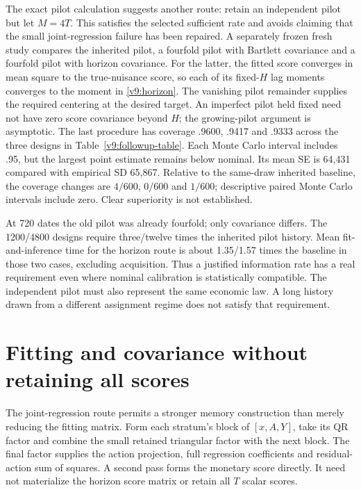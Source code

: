 The exact pilot calculation suggests another route: retain an independent
pilot but let $M=4T$. This satisfies the selected sufficient rate and avoids
claiming that the small joint-regression failure has been repaired.
A separately frozen fresh study compares the inherited pilot, a fourfold
pilot with Bartlett covariance and a fourfold pilot with horizon covariance.
For the latter, the fitted score converges in mean square to the true-nuisance
score, so each of its fixed-$H$ lag moments converges to the moment in
\eqref{v9:horizon}. The vanishing pilot remainder supplies the required
centering at the desired target. An imperfect pilot held fixed need not have
zero score covariance beyond $H$; the growing-pilot argument is asymptotic.
The last procedure has coverage .9600, .9417 and .9333 across the three
designs in Table~\ref{v9:followup-table}. Each Monte Carlo interval includes
.95, but the largest point estimate remains below nominal. Its mean SE is
64,431 compared with empirical SD 65,867. Relative to the same-draw inherited
baseline, the coverage changes are $4/600$, $0/600$ and $1/600$; descriptive
paired Monte Carlo intervals include zero. Clear superiority is not established.

At 720 dates the old pilot was already fourfold; only covariance differs.
The 1200/4800 designs require three/twelve times the inherited pilot history.
Mean fit-and-inference time for the horizon route is about 1.35/1.57 times the
baseline in those two cases, excluding acquisition. Thus a justified
information rate has a real requirement even where nominal calibration is
statistically compatible. The independent pilot must also represent the same
economic law. A long history drawn from a different assignment regime does not
satisfy that requirement.



\section{Fitting and covariance without retaining all scores}
\label{v9:execution}

The joint-regression route permits a stronger memory construction than merely
reducing the fitting matrix. Form each stratum's block of $[x,A,Y]$, take its QR
factor and combine the small retained triangular factor with the next block.
The final factor supplies the action projection, full regression coefficients
and residual-action sum of squares. A second pass forms the monetary score
directly. It need not materialize the horizon score matrix or retain all $T$
scalar scores.

